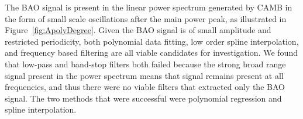 \documentclass[iop,twocolappendix]{emulateapj}
\newcommand{\red}{\color{red}}
\begin{document}
	The BAO signal is present in the linear power spectrum generated by CAMB in the form of small scale oscillations after the main power peak, as illustrated in Figure~\ref{fig:ApolyDegree}. %
	Given the BAO signal is of small amplitude and restricted periodicity, both polynomial data fitting, low order spline interpolation, and frequency based filtering are all viable candidates for investigation.
	We found that low-pass and band-stop filters both failed because the strong broad range signal present in the power spectrum means that signal remains present at all frequencies, and thus there were no viable filters that extracted only the BAO signal.  The two methods that were successful were polynomial regression and spline interpolation.  
	
\end{document}
